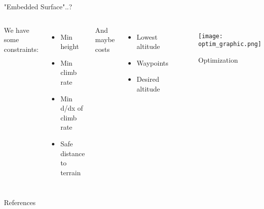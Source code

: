 \documentclass[xcolor=dvipsnames]{beamer}
\begin{document}
\begin{frame}{"Embedded Surface"..?}
    \begin{columns}[c]
        We have some constraints:
        \begin{itemize}
        \item Min height
        \item Min climb rate
        \item Min d/dx of climb rate
        \item Safe distance to terrain
        \end{itemize}
        And maybe costs
        \begin{itemize}
        \item Lowest altitude
        \item Waypoints
        \item Desired altitude
        \end{itemize}

        \begin{figure}
        \texttt{[image: optim\_graphic.png]}
        \caption{Optimization}
        \end{figure}

    \end{columns}
\end{frame}


\begin{frame}{References}
    \printbibliography
\end{frame}
\end{document}
